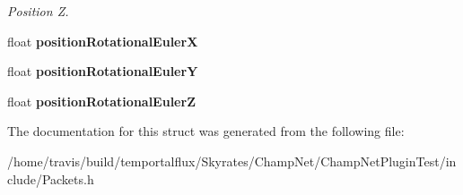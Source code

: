 \begin{DoxyCompactItemize}
\begin{DoxyCompactList}\small\item\em Position Z. \end{DoxyCompactList}\item 
\hypertarget{struct_packet_update_physics_a90730edacbc6ab2c4fc2f1f822c3e07a}{float {\bfseries position\-Rotational\-Euler\-X}}\label{struct_packet_update_physics_a90730edacbc6ab2c4fc2f1f822c3e07a}

\item 
\hypertarget{struct_packet_update_physics_a74c143f006eaf0a30148db803ac68d22}{float {\bfseries position\-Rotational\-Euler\-Y}}\label{struct_packet_update_physics_a74c143f006eaf0a30148db803ac68d22}

\item 
\hypertarget{struct_packet_update_physics_a70a058c5e6382091a775314d078f2602}{float {\bfseries position\-Rotational\-Euler\-Z}}\label{struct_packet_update_physics_a70a058c5e6382091a775314d078f2602}

\end{DoxyCompactItemize}


The documentation for this struct was generated from the following file\-:\begin{DoxyCompactItemize}
\item 
/home/travis/build/temportalflux/\-Skyrates/\-Champ\-Net/\-Champ\-Net\-Plugin\-Test/include/Packets.\-h\end{DoxyCompactItemize}
